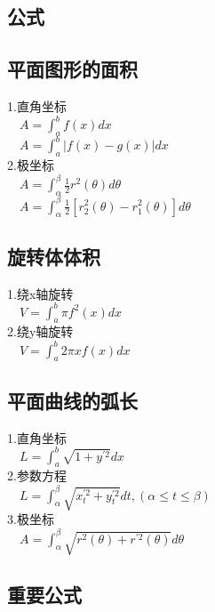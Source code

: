 \documentclass{article}
\begin{document}
\begin{flushleft}
	\LARGE
	
	\section{公式}
	
	\subsection{平面图形的面积}
	
	1.直角坐标\\
	\ \ $A=\int_{a}^{b}f(x)dx$\\
	\ \ $A=\int_{a}^{b}|f(x)-g(x)|dx$\\
	2.极坐标\\
	\ \ $A=\int_{\alpha}^{\beta}\frac{1}{2}r^2(\theta)d\theta$\\
	\ \ $A=\int_{\alpha}^{\beta}\frac{1}{2}[r_2^2(\theta)-r_1^2(\theta)]d\theta$\\
	
	\subsection{旋转体体积}
	
	1.绕x轴旋转\\
	\ \ $V=\int_{a}^{b}\pi f^2(x)dx$\\
	2.绕y轴旋转\\
	\ \ $V=\int_{a}^{b}2\pi xf(x)dx$\\
	
	\subsection{平面曲线的弧长}
	
	1.直角坐标\\
	\ \ $L=\int_{a}^{b}\sqrt{1+y^{'2}}dx$\\
	2.参数方程\\
	\ \ $L=\int_{\alpha}^{\beta}\sqrt{x_t^{'2}+y_t^{'2}}dt, (\alpha \le t \le \beta)$\\
	3.极坐标\\
	\ \ $A=\int_{\alpha}^{\beta}\sqrt{r^2(\theta)+r^{'2}(\theta)}d\theta$\\
	
	\subsection{重要公式}
	

\end{flushleft}
\end{document}
